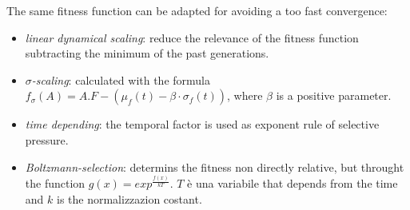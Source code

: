 \documentclass{article}
\begin{document}
The same fitness function can be adapted for avoiding a too fast convergence:
\begin{itemize}
    \item \textit{linear dynamical scaling}: reduce the relevance of the fitness function
          subtracting the minimum of the past generations.
    \item \textit{$\sigma$-scaling}: calculated with the formula $f_\sigma(A)=A.F-(\mu_f(t)-\beta\cdot\sigma_f(t))$,
          where $\beta$ is a positive parameter.
    \item \textit{time depending}: the temporal factor is used as exponent rule of selective pressure.
    \item \textit{Boltzmann-selection}: determins the fitness non directly relative, but
          throught the function $g(x)=exp^{\frac{f(x)}{kT}}$. $T$ è una variabile that depends from the
          time and $k$ is the normalizzazion costant.
\end{itemize}
\end{document}
